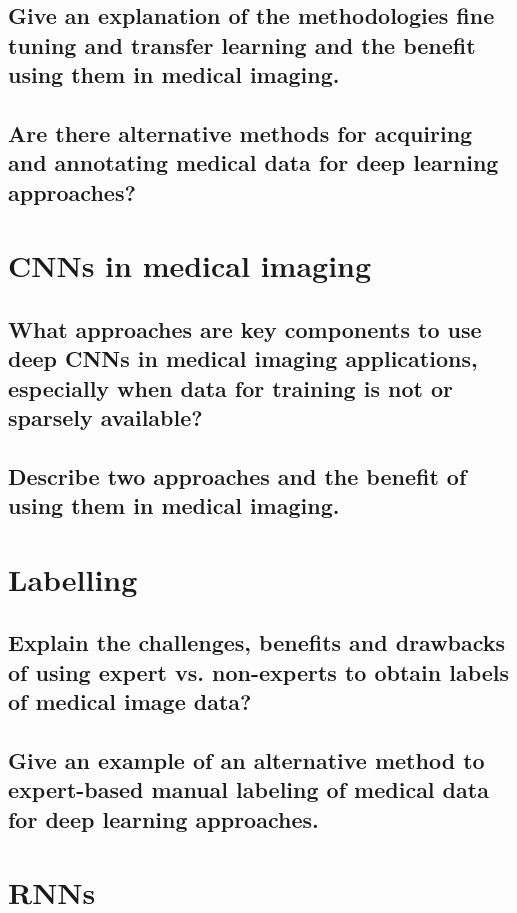 \subsection{Give an explanation of the methodologies fine tuning and transfer learning and the benefit using them in medical imaging. }

\subsection{Are there alternative methods for acquiring and annotating medical data for deep learning approaches?}

\section{CNNs in medical imaging}

\subsection{What approaches are key components to use deep CNNs in medical imaging applications, especially when data for training is not or sparsely available?}

\subsection{Describe two approaches and the benefit of using them in medical imaging.}

\section{Labelling}

\subsection{Explain the challenges, benefits and drawbacks of using expert vs. non-experts to obtain labels of medical image data?}

\subsection{Give  an example of an alternative method to expert-based manual labeling of medical data for deep learning approaches.}

\section{RNNs}

